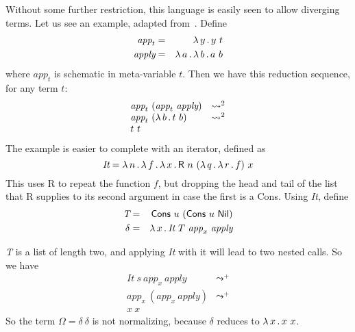 \documentclass{article}
\begin{document}
\noindent Without some further restriction, this language is
easily seen to allow diverging terms.  Let us see an example, adapted
from~\cite{alves10}.  Define
\begin{eqnarray*}
  \textit{app}_t & = & \lambda\, y\, .\, y\ t \\
  \textit{apply} & = & \lambda\, a\, .\, \lambda\, b\, .\, a\ b \\
\end{eqnarray*}
\noindent where $\textit{app}_t$ is schematic in meta-variable $t$. Then we have this reduction sequence, for any term $t$:
\[
\begin{array}{ll}
  \textit{app}_t\ (\textit{app}_t\ \textit{apply}) & \leadsto^2 \\
  \textit{app}_t\ (\lambda\, b\, .\, t\ b) & \leadsto^2 \\
  t\ t& \
  \end{array}
\]
\noindent The example is easier to complete with an iterator, defined as
\[
\textit{It} = \lam{n}{\lam{f}{\lam{x}{\mathsf{R}\ n\ (\lam{q}{\lam{r}{f}})\ x}}}
\]
\noindent This uses \textsf{R} to repeat the function $f$, but dropping the head
and tail of the list that \textsf{R} supplies to its second argument in case the first is a \textsf{Cons}.  Using \textit{It}, define
\begin{eqnarray*}
\textit{T} & = & \mathsf{Cons}\ u\ (\mathsf{Cons}\ u\ \mathsf{Nil}) \\
\delta & = & \lam{x}{\textit{It}\ T\ \textit{app}_x\ \textit{apply}}
\end{eqnarray*}

\noindent \textit{T} is a list of length two, and applying \textit{It} with it
will lead to two nested calls.  So we have
\[
\begin{array}{ll}
  \textit{It}\ s\ \textit{app}_x\ \textit{apply} & \leadsto^+ \\
  \textit{app}_x\ (\textit{app}_x\ \textit{apply}) & \leadsto^+ \\
  x\ x& \
\end{array}
\]
\noindent So the term $\Omega = \delta\ \delta$ is not normalizing, 
because $\delta$ reduces to $\lambda\, x\, .\, x\ x$.
\end{document}
